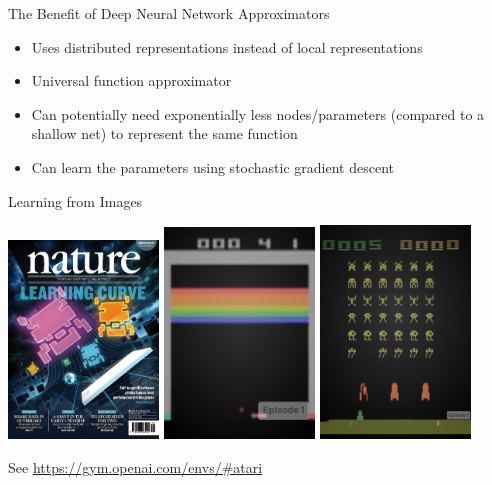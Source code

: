 \begin{frame}[c]{The Benefit of Deep Neural Network Approximators}
	
	\begin{itemize}
		\item Uses distributed representations instead of local representations
		\item Universal function approximator
		\item Can potentially need exponentially less nodes/parameters (compared to
		a shallow net) to represent the same function
		\item Can learn the parameters using stochastic gradient descent
	\end{itemize}

\end{frame}
\begin{frame}[c]{Learning from Images}
	
\centering
\includegraphics[width=0.3\textwidth]{../w01_big_picture/images/nature_atari_rl.jpg}
\includegraphics[width=0.3\textwidth]{images/breakout.png}
\includegraphics[width=0.3\textwidth]{images/space_invaders.png}

\begin{flushright}
See \url{https://gym.openai.com/envs/\#atari}	
\end{flushright}

	
\end{frame}
